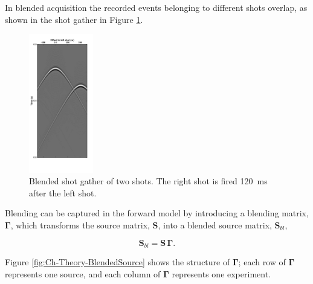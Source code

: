 In blended acquisition the recorded events belonging to different shots overlap, as shown in the shot gather in Figure \ref{fig:Ch-Theory-BlendedData}. 

\begin{figure}
	\centering
	\includegraphics[width=0.25\textwidth]{Plots/Mahdad/30iter/BlendedCSG_sh1-edit_copy}
	\caption{Blended shot gather of two shots. The right shot is fired \SI{120}{\milli\second} after the left shot.}
	\label{fig:Ch-Theory-BlendedData}
\end{figure}

Blending can be captured in the forward model by introducing a blending matrix, $\mathbf{\Gamma}$, which transforms the source matrix, $\mathbf{S}$, into a blended source matrix, $\mathbf{S}_{bl}$,

\begin{equation}
	\mathbf{S}_{bl} = \mathbf{S \, \Gamma}.
	\label{eq:Ch-Theory-BlendedSource}
\end{equation}

 Figure \ref{fig:Ch-Theory-BlendedSource} shows the structure of $\mathbf{\Gamma}$; each row of $\mathbf{\Gamma}$ represents one source, and each column of $\mathbf{\Gamma}$ represents one experiment. 
 
